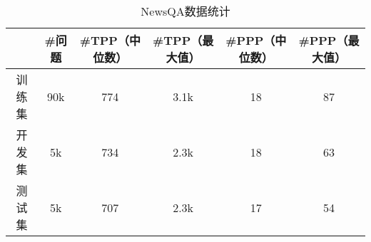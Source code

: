 \begin{table}[htbp]
    \centering
    \caption{NewsQA数据统计}
    \label{tab:2-2}
    \begin{tabular}{c|c|c|c|c|c}
        \hline
        & \#问题 & \#TPP（中位数） & \#TPP（最大值） & \#PPP（中位数）& \#PPP（最大值） \\
        \hline
        训练集 & 90k & 774 & 3.1k & 18 & 87 \\
        开发集 & 5k & 734 & 2.3k & 18 & 63 \\
        测试集 & 5k & 707 & 2.3k & 17 & 54 \\
        \hline
    \end{tabular}
\end{table}

